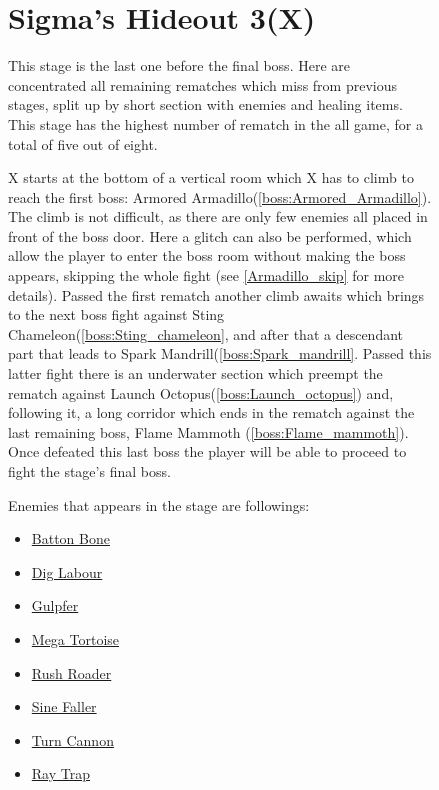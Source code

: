 \begin{figure}[htp]
\section{Sigma's Hideout 3(X)}
This stage is the last one before the final boss. Here are concentrated all remaining rematches which miss from previous stages, split up by short section with enemies and healing items. This stage has the highest number of rematch in the all game, for a total of five out of eight.

X starts at the bottom of a vertical room which X has to climb to reach the first boss: Armored Armadillo(\ref{boss:Armored_Armadillo}). The climb is not difficult, as there are only few enemies all placed in front of the boss door. Here a glitch can also be performed, which allow the player to enter the boss room without making the boss appears, skipping the whole fight (see \ref{Armadillo_skip} for more details). Passed the first rematch another climb awaits which brings to the next boss fight against Sting Chameleon(\ref{boss:Sting_chameleon}, and after that a descendant part that leads to Spark Mandrill(\ref{boss:Spark_mandrill}. Passed this latter fight there is an underwater section which preempt the rematch against Launch Octopus(\ref{boss:Launch_octopus}) and, following it, a long corridor which ends in the rematch against the last remaining boss, Flame Mammoth (\ref{boss:Flame_mammoth}). Once defeated this last boss the player will be able to proceed to fight the stage's final boss.

Enemies that appears in the stage are followings\cite{wiki:sigma_stages}:

\begin{itemize}
	\item \hyperlink{enem:Batton_Bone}{Batton Bone}
	\item \hyperlink{enem:Dig_Labour}{Dig Labour}
	\item \hyperlink{enem:Gulpfer}{Gulpfer}
	\item \hyperlink{enem:Mega_Tortoise}{Mega Tortoise}
	\item \hyperlink{enem:Rush_Roader}{Rush Roader}
	\item \hyperlink{enem:Sine_Faller}{Sine Faller}
	\item \hyperlink{enem:Turn_Cannon}{Turn Cannon}
	\item \hyperlink{enem:Ray_Trap}{Ray Trap}
\end{itemize} 


\end{figure}
